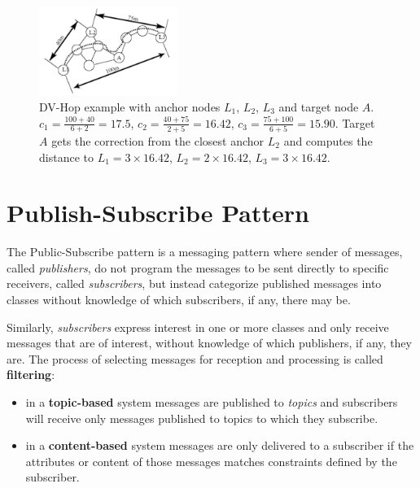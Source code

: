 \documentclass[a4paper,12pt]{article}
\begin{document}
\begin{enumerate}[label=(\alph*)]
\begin{enumerate}[label=(\roman*)]
    \begin{figure}[t]
      \centering
      \includegraphics[width=0.4\textwidth]{img/dv-hop}
      \caption{\label{fig:dv-hop}DV-Hop example with anchor nodes $L_1$, $L_2$, $L_3$ and target node $A$. $c_1 = \frac{100+40}{6+2} = 17.5$, $c_2 = \frac{40+75}{2+5} = 16.42$, $c_3 = \frac{75+100}{6+5} = 15.90$. Target $A$ gets the correction from the closest anchor $L_2$ and computes the distance to $L_1 = 3 \times 16.42$, $L_2 = 2 \times 16.42$, $L_3 = 3 \times 16.42$.}
    \end{figure}
  \end{enumerate}
\end{enumerate}

\clearpage

\section{Publish-Subscribe Pattern}
The Public-Subscribe pattern is a messaging pattern where sender of messages, called \textit{publishers}, do not program the messages to be sent directly to specific receivers, called \textit{subscribers}, but instead categorize published messages into classes without knowledge of which subscribers, if any, there may be.

Similarly, \textit{subscribers} express interest in one or more classes and only receive messages that are of interest, without knowledge of which publishers, if any, they are. The process of selecting messages for reception and processing is called \textbf{filtering}:
\begin{itemize}
  \item in a \textbf{topic-based} system messages are published to \textit{topics} and subscribers will receive only messages published to topics to which they subscribe.
  \item in a \textbf{content-based} system messages are only delivered to a subscriber if the attributes or content of those messages matches constraints defined by the subscriber.
\end{itemize}
\end{document}
